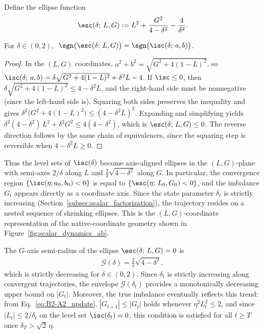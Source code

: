 \documentclass{article}
\begin{document}
Define the ellipse function
\begin{align}
    \esc(\delta;\, L, G)
    := L^2 + \frac{G^2}{4 - \delta^2} - \frac{4}{\delta^2}.
    \label{eq:ellipse}
\end{align}

\begin{proposition}\label{prop:ellipse_equivalence}
For $\delta \in (0,2)$, $\;\sgn\bigl(\esc(\delta;\,L,G)\bigr)
= \sgn\bigl(\isc(\delta;\,a,b)\bigr)$.
\end{proposition}
\begin{proof}
In the $(L,G)$ coordinates, $a^2 + b^2 = \sqrt{G^2 + 4(1-L)^2}$, so
$\isc(\delta;\,a,b) = \delta\sqrt{G^2 + 4(1-L)^2} + \delta^2 L - 4$.
If $\isc \le 0$, then $\delta\sqrt{G^2 + 4(1-L)^2} \le 4 - \delta^2 L$, and the right-hand side
must be nonneg\-ative (since the left-hand side is). Squaring both sides preserves
the inequality and gives
$\delta^2\bigl(G^2 + 4(1-L)^2\bigr) \le (4 - \delta^2 L)^2$.
Expanding and simplifying yields
$\delta^2(4-\delta^2)\,L^2 + \delta^2 G^2 \le 4(4-\delta^2)$,
which is $\esc(\delta;\,L,G) \le 0$.
The reverse direction follows by the same chain of equivalences, since the
squaring step is reversible when $4 - \delta^2 L \ge 0$.
\end{proof}

Thus the level sets of $\isc(\delta)$ become axis-aligned ellipses in the
$(L,G)$-plane with semi-axes $2/\delta$ along $L$ and
$\frac{2}{\delta}\sqrt{4-\delta^2}$ along $G$.
In particular, the convergence region $\{\isc(\eta;a_0, b_0) < 0\}$ is equal to
$\{\esc(\eta;\,L_0,G_0) < 0\}$, and the imbalance $G_t$ appears directly as a
coordinate axis.
Since the state parameter $\delta_t$ is strictly increasing
(Section~\ref{subsec:scalar_factorization}), the trajectory resides on a
nested sequence of shrinking ellipses. This is the $(L,G)$-coordinate
representation of the native-coordinate geometry shown in
Figure~\ref{fig:scalar_dynamics_ab}.

\begin{remark}\label{rmk:imbalance_envelope}
The $G$-axis semi-radius of the ellipse $\esc(\delta;\,L,G) = 0$ is
\begin{align}
    \mathcal{G}(\delta) = \frac{2}{\delta}\sqrt{4 - \delta^2},
\end{align}
which is strictly decreasing for $\delta \in (0,2)$.
Since $\delta_t$ is strictly increasing along convergent trajectories,
the envelope $\mathcal{G}(\delta_t)$ provides a monotonically
decreasing upper bound on $|G_t|$.
Moreover, the true imbalance eventually reflects this trend:
from  Eq.~\eqref{eq:B2-A2_update}, $|G_{t+1}| \le |G_t|$ holds whenever
$\eta^2 L_t^2 \le 2$, and since $|L_t| \le 2/\delta_t$ on the level set
$\isc(\delta_t) = 0$, this condition is satisfied for all $t \ge T$
once $\delta_T > \sqrt{2}\,\eta$.
\end{remark}
\end{document}
